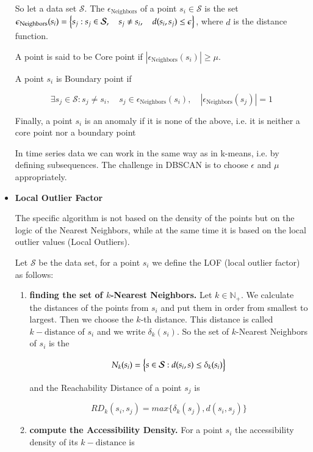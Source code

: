 \documentclass[a4paper,12pt]{report}
\theoremstyle{definitionNODot}
\begin{document}
\begin{itemize}
		So let a data set $\mathcal{S}$. The $\epsilon_\text{Neighbors}$ of a point $s_i\in\mathcal{S}$ is the set $\epsilon_\text{Neighbors}(s_i) = \Bigl \{s_j : s_j\in\mathcal{S}, \quad s_j\neq s_i, \quad d(s_i,s_j)\leq \epsilon \Bigl \} $, where $d$ is the distance function.
		
		A point is said to be Core point if $| \epsilon_\text{Neighbors}(s_i) | \geq \mu$.
		
		A point $s_i$ is Boundary point if 
		
		$$ \exists s_j \in \mathcal{S} : s_j\neq s_i, \quad s_j \in \epsilon_\text{Neighbors}(s_i), \quad | \epsilon_\text{Neighbors}(s_j) | = 1 $$  
		
		Finally, a point $s_i$ is an anomaly if it is none of the above, i.e. it is neither a core point nor a boundary point
		
		In time series data we can work in the same way as in k-means, i.e. by defining subsequences. The challenge in DBSCAN is to choose $\epsilon$ and $\mu$ appropriately.
		
		\item \textbf{Local Outlier Factor}
		
		The specific algorithm is not based on the density of the points but on the logic of the Nearest Neighbors, while at the same time it is based on the local outlier values (Local Outliers).
		
		Let $\mathcal{S}$ be the data set, for a point $s_i$ we define the LOF (local outlier factor) as follows:
		
		\begin{enumerate}
			\item \textbf{finding the set of $k$-Nearest Neighbors.} Let $k\in \mathbb{N}_+$. We calculate the distances of the points from $s_i$ and put them in order from smallest to largest. Then we choose the $k$-th distance. This distance is called $k-\text{distance}$ of $s_i$ and we write $\delta_k(s_i)$. So the set of $k$-Nearest Neighbors of $s_i$ is the
			
			$$N_k(s_i) = \Bigl \{ s \in \mathcal{S} : d(s_i,s) \leq \delta_k(s_i) \Bigl \} $$
			
			and the Reachability Distance of a point $s_j$ is 
			
			$$ RD_k(s_i,s_j) = max\{ \delta_k(s_j), d(s_i,s_j) \} $$
			
			\item \textbf{compute the Accessibility Density.} For a point $s_i$ the accessibility density of its $k-\text{distance}$ is
			

\end{enumerate}
\end{itemize}
\end{document}
